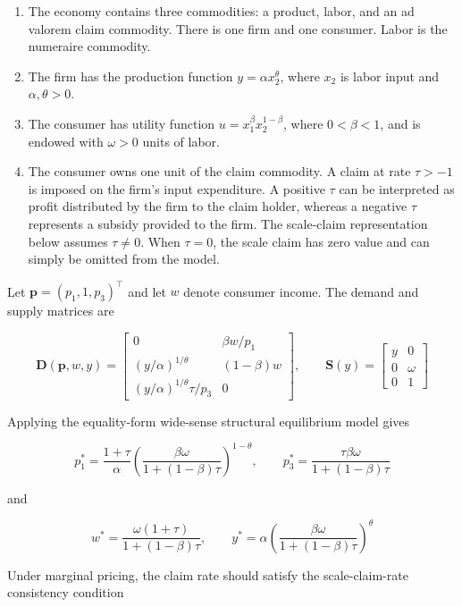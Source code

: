\documentclass[
  letterpaper,
  DIV=11,
  numbers=noendperiod]{scrreprt}
\begin{document}
\begin{enumerate}
\def\labelenumi{\arabic{enumi}.}
\item
  The economy contains three commodities: a product, labor, and an ad
  valorem claim commodity. There is one firm and one consumer. Labor is
  the numeraire commodity.
\item
  The firm has the production function \(y=\alpha x_2^\theta\), where
  \(x_2\) is labor input and \(\alpha,\theta>0\).
\item
  The consumer has utility function \(u=x_1^\beta x_2^{1-\beta}\), where
  \(0<\beta<1\), and is endowed with \(\omega>0\) units of labor.
\item
  The consumer owns one unit of the claim commodity. A claim at rate
  \(\tau>-1\) is imposed on the firm's input expenditure. A positive
  \(\tau\) can be interpreted as profit distributed by the firm to the
  claim holder, whereas a negative \(\tau\) represents a subsidy
  provided to the firm. The scale-claim representation below assumes
  \(\tau\ne0\). When \(\tau=0\), the scale claim has zero value and can
  simply be omitted from the model.
\end{enumerate}

Let \(\mathbf p=(p_1,1,p_3)^\top\) and let \(w\) denote consumer income.
The demand and supply matrices are

\[
\mathbf D(\mathbf p,w,y)=
\begin{bmatrix}
0&\beta w/p_1\\
(y/\alpha)^{1/\theta}&(1-\beta)w\\
(y/\alpha)^{1/\theta}\tau/p_3&0
\end{bmatrix},
\qquad
\mathbf S(y)=
\begin{bmatrix}
y&0\\
0&\omega\\
0&1
\end{bmatrix}
\]

Applying the equality-form wide-sense structural equilibrium model gives

\[
p_1^*=
\frac{1+\tau}{\alpha}
\left(
\frac{\beta\omega}{1+(1-\beta)\tau}
\right)^{1-\theta},
\qquad
p_3^*=
\frac{\tau\beta\omega}{1+(1-\beta)\tau}
\]

and

\[
w^*=
\frac{\omega(1+\tau)}{1+(1-\beta)\tau},
\qquad
y^*=
\alpha
\left(
\frac{\beta\omega}{1+(1-\beta)\tau}
\right)^\theta
\]

Under marginal pricing, the claim rate should satisfy the
scale-claim-rate consistency condition
\end{document}
